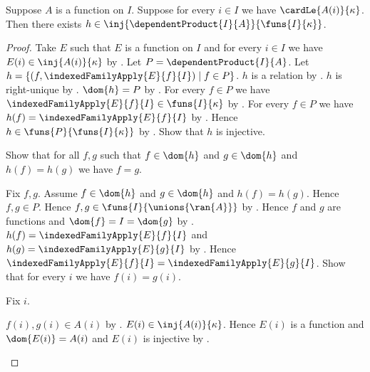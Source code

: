 \begin{theorem}\label{dependent_product_injection_into_function_space}
    Suppose $A$ is a function on $I$.
    Suppose for every $i\in I$ we have $\cardLe{A(i)}{\kappa}$.
    Then there exists
        $h\in\inj{\dependentProduct{I}{A}}{\funs{I}{\kappa}}$.
\end{theorem}
\begin{proof}
    Take $E$ such that $E$ is a function on $I$ and
        for every $i\in I$ we have $E(i)\in\inj{A(i)}{\kappa}$
        by .
    Let $P=\dependentProduct{I}{A}$.
    Let $h=\{(f,\indexedFamilyApply{E}{f}{I})\mid f\in P\}$.
    $h$ is a relation by .
    $h$ is right-unique by .
    $\dom{h}=P$ by .
    For every $f\in P$ we have
        $\indexedFamilyApply{E}{f}{I}\in\funs{I}{\kappa}$
        by .
    For every $f\in P$ we have
        $h(f)=\indexedFamilyApply{E}{f}{I}$
        by .
    Hence $h\in\funs{P}{\funs{I}{\kappa}}$ by .
    Show that $h$ is injective.
    \begin{subproof}
        Show that for all $f,g$ such that $f\in\dom{h}$ and
            $g\in\dom{h}$ and $h(f)=h(g)$ we have $f=g$.
        \begin{subproof}
            Fix $f,g$.
            Assume $f\in\dom{h}$ and $g\in\dom{h}$ and $h(f)=h(g)$.
            Hence $f,g\in P$.
            Hence $f,g\in\funs{I}{\unions{\ran{A}}}$
                by .
            Hence $f$ and $g$ are functions and
                $\dom{f}=I=\dom{g}$
                by .
            $h(f)=\indexedFamilyApply{E}{f}{I}$ and
                $h(g)=\indexedFamilyApply{E}{g}{I}$
                by .
            Hence $\indexedFamilyApply{E}{f}{I}
                =\indexedFamilyApply{E}{g}{I}$.
            Show that for every $i$ we have $f(i)=g(i)$.
            \begin{subproof}
                Fix $i$.
                \begin{byCase}
                        $f(i),g(i)\in A(i)$
                            by .
                        $E(i)\in\inj{A(i)}{\kappa}$.
                        Hence $E(i)$ is a function and
                            $\dom{E(i)}=A(i)$ and $E(i)$ is injective
                            by .

\end{byCase}
\end{subproof}
\end{subproof}
\end{subproof}
\end{proof}
